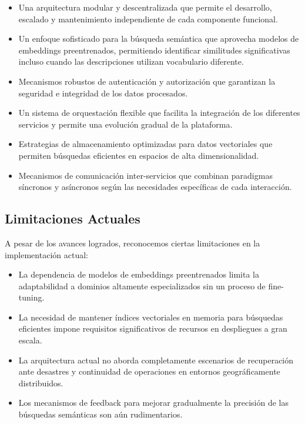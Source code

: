 \documentclass[12pt,a4paper]{article}
\begin{document}
\begin{itemize}
    \item Una arquitectura modular y descentralizada que permite el desarrollo, escalado y mantenimiento independiente de cada componente funcional.
    
    \item Un enfoque sofisticado para la búsqueda semántica que aprovecha modelos de embeddings preentrenados, permitiendo identificar similitudes significativas incluso cuando las descripciones utilizan vocabulario diferente.
    
    \item Mecanismos robustos de autenticación y autorización que garantizan la seguridad e integridad de los datos procesados.
    
    \item Un sistema de orquestación flexible que facilita la integración de los diferentes servicios y permite una evolución gradual de la plataforma.
    
    \item Estrategias de almacenamiento optimizadas para datos vectoriales que permiten búsquedas eficientes en espacios de alta dimensionalidad.
    
    \item Mecanismos de comunicación inter-servicios que combinan paradigmas síncronos y asíncronos según las necesidades específicas de cada interacción.
\end{itemize}

\subsection{Limitaciones Actuales}
\label{subsec:limitaciones}

A pesar de los avances logrados, reconocemos ciertas limitaciones en la implementación actual:

\begin{itemize}
    \item La dependencia de modelos de embeddings preentrenados limita la adaptabilidad a dominios altamente especializados sin un proceso de fine-tuning.
    
    \item La necesidad de mantener índices vectoriales en memoria para búsquedas eficientes impone requisitos significativos de recursos en despliegues a gran escala.
    
    \item La arquitectura actual no aborda completamente escenarios de recuperación ante desastres y continuidad de operaciones en entornos geográficamente distribuidos.
    
    \item Los mecanismos de feedback para mejorar gradualmente la precisión de las búsquedas semánticas son aún rudimentarios.
\end{itemize}
\end{document}
